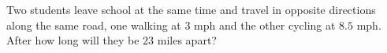 Two students leave school at the same time and travel in opposite directions along the same road, one walking at $3$ mph and the other cycling at $8.5$ mph. After how long will they be $23$ miles apart?
